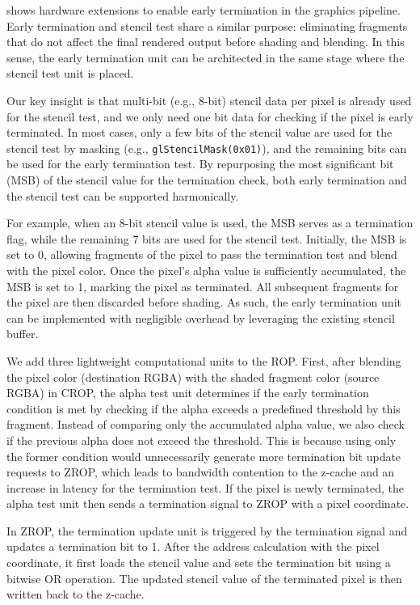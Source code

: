 
 shows hardware extensions to enable early termination
in the graphics pipeline. Early termination and stencil test share a similar
purpose: eliminating fragments that do not affect the final rendered output
before shading and blending. In this sense, the early termination unit can be
architected in the same stage where the stencil test unit is placed.

Our key insight is that multi-bit (e.g., 8-bit) stencil data per pixel is
already used for the stencil test, and we only need one bit data for checking
if the pixel is early terminated.
%
In most cases, only a few bits of the stencil value are used for the stencil
test by masking (e.g., \texttt{\small glStencilMask(0x01)}), and the remaining
bits can be used for the early termination test. 
%
By repurposing the most significant bit (MSB) of the stencil value for the
termination check, both early termination and the stencil test can be supported
harmonically. 

For example, when an 8-bit stencil value is used, the MSB serves as a
termination flag, while the remaining 7 bits are used for the stencil test.
%
Initially, the MSB is set to 0, allowing fragments of the pixel to pass the
termination test and blend with the pixel color.
%
Once the pixel's alpha value is sufficiently accumulated, the MSB is set to 1,
marking the pixel as terminated.
%
All subsequent fragments for the pixel are then discarded before shading.
%
As such, the early termination unit can be implemented with negligible overhead
by leveraging the existing stencil buffer. 

We add three lightweight computational units to the ROP. First, after blending
the pixel color (destination RGBA) with the shaded fragment color (source RGBA)
in CROP, the alpha test unit determines if the early termination condition is
met by checking if the alpha exceeds a predefined threshold by this fragment.
% 
Instead of comparing only the accumulated alpha value, we also check if the
previous alpha does not exceed the threshold.
%
This is because using only the former condition would unnecessarily generate
more termination bit update requests to ZROP, which leads to bandwidth
contention to the z-cache and an increase in latency for the termination test.
%
If the pixel is newly terminated, the alpha test unit then sends a termination
signal to ZROP with a pixel coordinate.

In ZROP, the termination update unit is triggered by the termination signal and
updates a termination bit to 1. After the address calculation with the pixel
coordinate, it first loads the stencil value and sets the termination bit using
a bitwise OR operation. The updated stencil value of the terminated pixel is
then written back to the z-cache.

